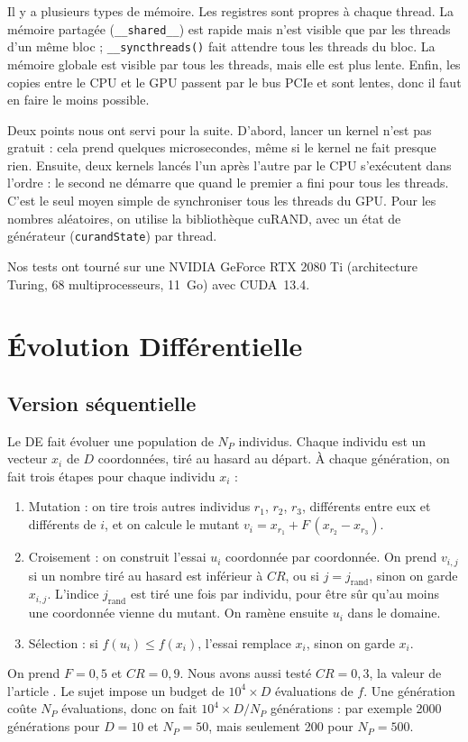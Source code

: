 \documentclass[conference]{IEEEtran}
\begin{document}
Il y a plusieurs types de m\'emoire. Les registres sont propres \`a chaque thread. La m\'emoire partag\'ee (\texttt{\_\_shared\_\_}) est rapide mais n'est visible que par les threads d'un m\^eme bloc ; \texttt{\_\_syncthreads()} fait attendre tous les threads du bloc. La m\'emoire globale est visible par tous les threads, mais elle est plus lente. Enfin, les copies entre le CPU et le GPU passent par le bus PCIe et sont lentes, donc il faut en faire le moins possible.

Deux points nous ont servi pour la suite. D'abord, lancer un kernel n'est pas gratuit : cela prend quelques microsecondes, m\^eme si le kernel ne fait presque rien. Ensuite, deux kernels lanc\'es l'un apr\`es l'autre par le CPU s'ex\'ecutent dans l'ordre : le second ne d\'emarre que quand le premier a fini pour tous les threads. C'est le seul moyen simple de synchroniser tous les threads du GPU. Pour les nombres al\'eatoires, on utilise la biblioth\`eque cuRAND, avec un \'etat de g\'en\'erateur (\texttt{curandState}) par thread.

Nos tests ont tourn\'e sur une NVIDIA GeForce RTX 2080 Ti (architecture Turing, 68 multiprocesseurs, 11~Go) avec CUDA~13.4.

\section{\'Evolution Diff\'erentielle}

\subsection{Version s\'equentielle}
Le DE \cite{storn} fait \'evoluer une population de $N_P$ individus. Chaque individu est un vecteur $x_i$ de $D$ coordonn\'ees, tir\'e au hasard au d\'epart. \`A chaque g\'en\'eration, on fait trois \'etapes pour chaque individu $x_i$ :
\begin{enumerate}
\item Mutation : on tire trois autres individus $r_1$, $r_2$, $r_3$, diff\'erents entre eux et diff\'erents de $i$, et on calcule le mutant $v_i=x_{r_1}+F\,(x_{r_2}-x_{r_3})$.
\item Croisement : on construit l'essai $u_i$ coordonn\'ee par coordonn\'ee. On prend $v_{i,j}$ si un nombre tir\'e au hasard est inf\'erieur \`a $CR$, ou si $j=j_{\mathrm{rand}}$, sinon on garde $x_{i,j}$. L'indice $j_{\mathrm{rand}}$ est tir\'e une fois par individu, pour \^etre s\^ur qu'au moins une coordonn\'ee vienne du mutant. On ram\`ene ensuite $u_i$ dans le domaine.
\item S\'election : si $f(u_i)\le f(x_i)$, l'essai remplace $x_i$, sinon on garde $x_i$.
\end{enumerate}
On prend $F=0{,}5$ et $CR=0{,}9$. Nous avons aussi test\'e $CR=0{,}3$, la valeur de l'article \cite{qin}. Le sujet impose un budget de $10^4\times D$ \'evaluations de $f$. Une g\'en\'eration co\^ute $N_P$ \'evaluations, donc on fait $10^4\times D/N_P$ g\'en\'erations : par exemple 2000 g\'en\'erations pour $D=10$ et $N_P=50$, mais seulement 200 pour $N_P=500$.
\end{document}

